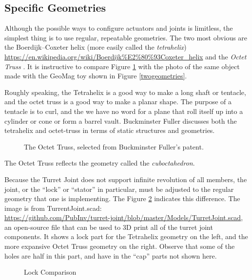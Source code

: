 \documentclass[11pt]{article}
\begin{document}
\subsection{Specific Geometries}

Although the possible ways to configure actuators and joints is limitless, the simplest thing is to
use regular, repeatable geometries. The two most obvious are the Boerdijk--Coxeter helix
(more easily called the \textit{tetrahelix})
\url{https://en.wikipedia.org/wiki/Boerdijk%E2%80%93Coxeter_helix}
  and the \emph{Octet Truss}
  \cite{richard1961synergetic}.
  It is instructive to compare Figure \ref{octet-truss-patent} with the photo of the same object
  made with the GeoMag toy shown in Figure \ref{twogeometries}.
    
Roughly speaking, the Tetrahelix is a good way to make a long shaft or tentacle, and the octet truss
is a good way to make a planar shape. The purpose of a tentacle is to curl, and the we have no word for
a plane that roll itself up into a cylinder or cone or form a barrel vault. Buckminster Fuller discusses
both the tetrahelix and octet-truss \cite{fuller1982synergetics} in terms of static structures and geometries.

\begin{figure}[!ht]
  \centering
    \caption[The Octet Truss]{The Octet Truss, selected from Buckminster Fuller's patent.}
      \label{octet-truss-patent}
\end{figure}

The Octet Truss reflects the geometry called the \emph{cuboctahedron}.

Because the Turret Joint does not support infinite revolution of all members, the joint, or the ``lock'' or ``stator'' in particular,
must be adjusted to the regular geometry that one is implementing.  The Figure \ref{lockcomparison} indicates this difference.
The image is from TurrentJoint.scad:\\
\href{https://github.com/PubInv/turret-joint/blob/master/Models/TurretJoint.scad}{https://github.com/PubInv/turret-joint/blob/master/Models/TurretJoint.scad}, an
open-source file that can be used to 3D print all of the turret joint components.
It shows a lock part for the Tetrahelix geometry
on the left, and the more expansive Octet Truss geometry on the right. Observe that some of the holes are half in this part,
and have in the ``cap'' parts not shown here.

\begin{figure}[!ht]
  \centering
    \caption[Lock Comparison]{Lock Comparison}
      \label{lockcomparison}
\end{figure}
\end{document}
